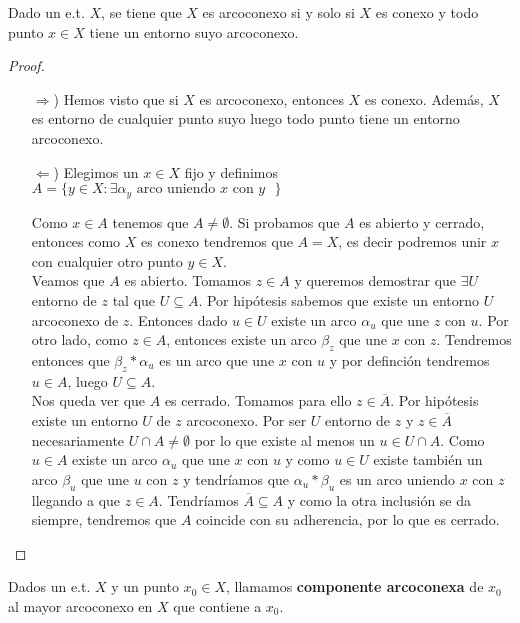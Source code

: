 \begin{teo}
    Dado un e.t. $X$, se tiene que $X$ es arcoconexo si y solo si $X$ es conexo y todo punto $x\in X$ tiene un entorno suyo arcoconexo.

    \begin{proof}\
        \begin{itemize}
            \item[$\Rightarrow$)] Hemos visto que si $X$ es arcoconexo, entonces $X$ es conexo. Además, $X$ es entorno de cualquier punto suyo luego todo punto tiene un entorno arcoconexo.
            \item[$\Leftarrow$)] Elegimos un $x\in X$ fijo y definimos $A = \{y\in X : \exists \alpha_y \text{ arco uniendo $x$ con $y$ }\}$
            
            Como $x\in A$ tenemos que $A\neq \emptyset$. Si probamos que $A$ es abierto y cerrado, entonces como $X$ es conexo tendremos que $A=X$, es decir podremos unir $x$ con cualquier otro punto $y\in X$.\\

            Veamos que $A$ es abierto. Tomamos $z\in A$ y queremos demostrar que $\exists U$ entorno de $z$ tal que $U\subseteq A$. Por hipótesis sabemos que existe un entorno $U$ arcoconexo de $z$. Entonces dado $u\in U$ existe un arco $\alpha_u$ que une $z$ con $u$. Por otro lado, como $z\in A$, entonces existe un arco $\beta_z$ que une $x$ con $z$. Tendremos entonces que $\beta_z\ast\alpha_u$ es un arco que une $x$ con $u$ y por definción tendremos $u\in A$, luego $U\subseteq A$.\\
            
            Nos queda ver que $A$ es cerrado. Tomamos para ello $z\in \overline{A}$. Por hipótesis existe un entorno $U$ de $z$ arcoconexo. Por ser $U$ entorno de $z$ y $z\in \overline{A}$ necesariamente $U\cap A \neq \emptyset$ por lo que existe al menos un $u\in U \cap A$. Como $u\in A$ existe un arco $\alpha_u$ que une $x$ con $u$ y como $u\in U$ existe también un arco $\beta_u$ que une $u$ con $z$ y tendríamos que $\alpha_u\ast\beta_u$ es un arco uniendo $x$ con $z$ llegando a que $z\in A$. Tendríamos $\overline{A}\subseteq A$ y como la otra inclusión se da siempre, tendremos que $A$ coincide con su adherencia, por lo que es cerrado.
        \end{itemize}
    \end{proof}
\end{teo}

\begin{definicion}
    Dados un e.t. $X$ y un punto $x_0\in X$, llamamos \textbf{componente arcoconexa} de $x_0$ al mayor arcoconexo en $X$ que contiene a $x_0$.
\end{definicion}

